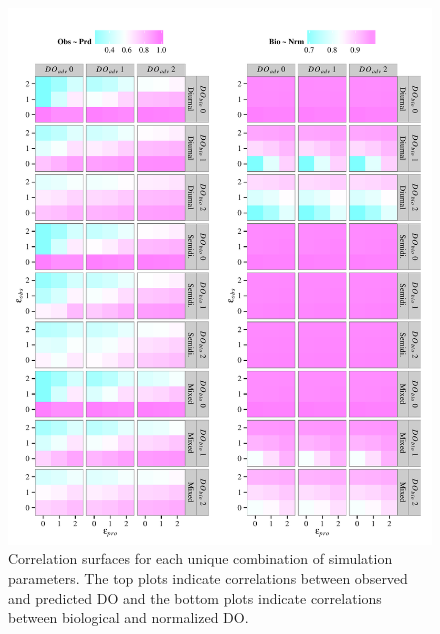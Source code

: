 \documentclass{article}\usepackage[]{graphicx}\usepackage[]{color}
\makeatletter
\def\maxwidth{ %
  \ifdim\Gin@nat@width>\linewidth
    \linewidth
  \else
    \Gin@nat@width
  \fi
}
\newenvironment{knitrout}{}{} %
\makeatother
\begin{document}
\begin{knitrout}
\color{fgcolor}\begin{figure}[!h]


{\centering \includegraphics[width=\maxwidth]{figure/cor_surf} 

}

\caption[Correlation surfaces for each unique combination of simulation parameters]{Correlation surfaces for each unique combination of simulation parameters.  The top plots indicate correlations between observed and predicted DO and the bottom plots indicate correlations between biological and normalized DO.\label{fig:cor_surf}}
\end{figure}


\end{knitrout}
\clearpage



\clearpage

\vfill


\vfill
\clearpage
\end{document}
